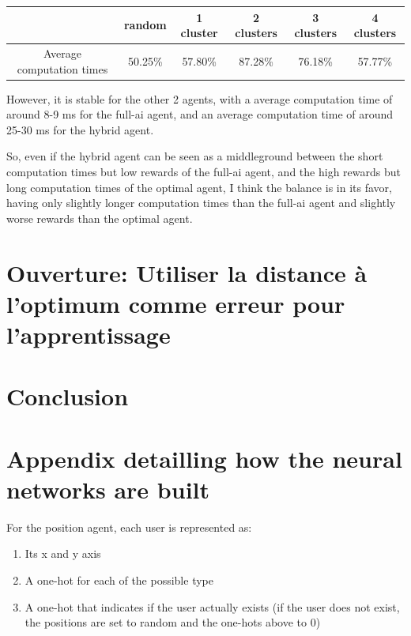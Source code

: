 \documentclass[letterpaper]{article}
\begin{document}
\begin{center}
    \begin{tabular}{|c|c|c|c|c|c|}
    \hline 
       & random & 1 cluster & 2 clusters & 3 clusters & 4 clusters \\ 
     \hline
     Average computation times & 50.25\% & 57.80\% & 87.28\% & 76.18\% & 57.77\% \\  
     \hline
    \end{tabular}
\end{center}

However, it is stable for the other 2 agents, with a average computation time of around 8-9 ms for the full-ai agent,
and an average computation time of around 25-30 ms for the hybrid agent.

So, even if the hybrid agent can be seen as a middleground between the short computation times but low rewards of the full-ai agent,
and the high rewards but long computation times of the optimal agent, I think the balance is in its favor,
having only slightly longer computation times than the full-ai agent and slightly worse rewards than the optimal agent.


\section{Ouverture: Utiliser la distance à l'optimum comme erreur pour l'apprentissage}

\section{Conclusion}






\appendix

\section{Appendix detailling how the neural networks are built}
\label{appendix}

For the position agent, each user is represented as:
\begin{enumerate}
    \item Its x and y axis
    \item A one-hot for each of the possible type
    \item A one-hot that indicates if the user actually exists (if the user does not exist, the positions are set to random and the one-hots above to 0)
\end{enumerate}
\end{document}
